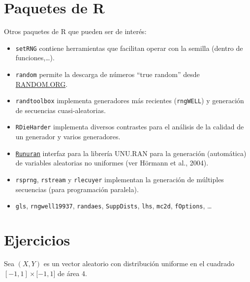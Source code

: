 \documentclass[
]{book}
\theoremstyle{break}
\theoremstyle{definition}
\theoremstyle{definition}
\theoremstyle{definition}
\theoremstyle{remark}
\let\BeginKnitrBlock\begin \let\EndKnitrBlock\end
\begin{document}
\hypertarget{paquetes-de-r}{%
\section{Paquetes de R}\label{paquetes-de-r}}

Otros paquetes de R que pueden ser de interés:

\begin{itemize}
\item
  \texttt{setRNG} contiene herramientas que facilitan operar con la semilla
  (dentro de funciones,\ldots).
\item
  \texttt{random} permite la descarga de números ``true random'' desde \href{https://www.random.org}{RANDOM.ORG}.
\item
  \texttt{randtoolbox} implementa generadores más recientes (\texttt{rngWELL}) y
  generación de secuencias cuasi-aleatorias.
\item
  \texttt{RDieHarder} implementa diversos contrastes para el análisis de la
  calidad de un generador y varios generadores.
\item
  \href{http://statmath.wu.ac.at/unuran}{\texttt{Runuran}} interfaz para la librería UNU.RAN para la
  generación (automática) de variables aleatorias no uniformes (ver Hörmann et al., 2004).
\item
  \texttt{rsprng}, \texttt{rstream} y \texttt{rlecuyer} implementan la generación de múltiples
  secuencias (para programación paralela).
\item
  \texttt{gls}, \texttt{rngwell19937}, \texttt{randaes}, \texttt{SuppDists}, \texttt{lhs}, \texttt{mc2d},
  \texttt{fOptions}, \ldots{}
\end{itemize}

\hypertarget{ejercicios}{%
\section{Ejercicios}\label{ejercicios}}

\BeginKnitrBlock{exercise}
\protect\hypertarget{exr:simpi}{}{\label{exr:simpi} }
\EndKnitrBlock{exercise}

Sea \((X,Y)\) es un vector aleatorio con distribución uniforme en el
cuadrado \([-1,1]\times\lbrack-1,1]\) de área 4.
\end{document}
